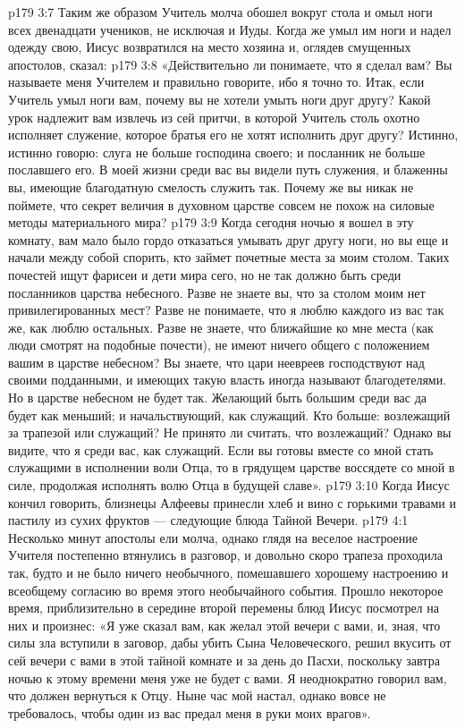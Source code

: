 \vs p179 3:7 Таким же образом Учитель молча обошел вокруг стола и омыл ноги всех двенадцати учеников, не исключая и Иуды. Когда же умыл им ноги и надел одежду свою, Иисус возвратился на место хозяина и, оглядев смущенных апостолов, сказал:
\vs p179 3:8 \pc «Действительно ли понимаете, что я сделал вам? Вы называете меня Учителем и правильно говорите, ибо я точно то. Итак, если Учитель умыл ноги вам, почему вы не хотели умыть ноги друг другу? Какой урок надлежит вам извлечь из сей притчи, в которой Учитель столь охотно исполняет служение, которое братья его не хотят исполнить друг другу? Истинно, истинно говорю: слуга не больше господина своего; и посланник не больше пославшего его. В моей жизни среди вас вы видели путь служения, и блаженны вы, имеющие благодатную смелость служить так. Почему же вы никак не поймете, что секрет величия в духовном царстве совсем не похож на силовые методы материального мира?
\vs p179 3:9 Когда сегодня ночью я вошел в эту комнату, вам мало было гордо отказаться умывать друг другу ноги, но вы еще и начали между собой спорить, кто займет почетные места за моим столом. Таких почестей ищут фарисеи и дети мира сего, но не так должно быть среди посланников царства небесного. Разве не знаете вы, что за столом моим нет привилегированных мест? Разве не понимаете, что я люблю каждого из вас так же, как люблю остальных. Разве не знаете, что ближайшие ко мне места (как люди смотрят на подобные почести), не имеют ничего общего с положением вашим в царстве небесном? Вы знаете, что цари неевреев господствуют над своими подданными, и имеющих такую власть иногда называют благодетелями. Но в царстве небесном не будет так. Желающий быть большим среди вас да будет как меньший; и начальствующий, как служащий. Кто больше: возлежащий за трапезой или служащий? Не принято ли считать, что возлежащий? Однако вы видите, что я среди вас, как служащий. Если вы готовы вместе со мной стать служащими в исполнении воли Отца, то в грядущем царстве воссядете со мной в силе, продолжая исполнять волю Отца в будущей славе».
\vs p179 3:10 Когда Иисус кончил говорить, близнецы Алфеевы принесли хлеб и вино с горькими травами и пастилу из сухих фруктов --- следующие блюда Тайной Вечери.
\vs p179 4:1 Несколько минут апостолы ели молча, однако глядя на веселое настроение Учителя постепенно втянулись в разговор, и довольно скоро трапеза проходила так, будто и не было ничего необычного, помешавшего хорошему настроению и всеобщему согласию во время этого необычайного события. Прошло некоторое время, приблизительно в середине второй перемены блюд Иисус посмотрел на них и произнес: «Я уже сказал вам, как желал этой вечери с вами, и, зная, что силы зла вступили в заговор, дабы убить Сына Человеческого, решил вкусить от сей вечери с вами в этой тайной комнате и за день до Пасхи, поскольку завтра ночью к этому времени меня уже не будет с вами. Я неоднократно говорил вам, что должен вернуться к Отцу. Ныне час мой настал, однако вовсе не требовалось, чтобы один из вас предал меня в руки моих врагов».
